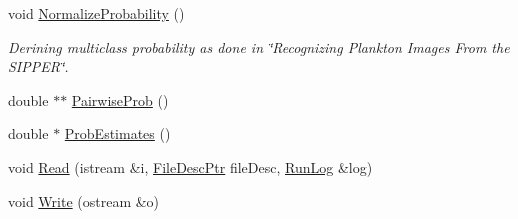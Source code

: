 \begin{DoxyCompactItemize}
\item 
void \hyperlink{struct_s_v_m289___b_f_s_1_1svm__model_a5d10aa2ae9d53ccf8f3526d36357c55d}{Normalize\+Probability} ()
\begin{DoxyCompactList}\small\item\em Derining multiclass probability as done in \char`\"{}\+Recognizing Plankton Images From the S\+I\+P\+P\+E\+R\char`\"{}. \end{DoxyCompactList}\item 
double $\ast$$\ast$ \hyperlink{struct_s_v_m289___b_f_s_1_1svm__model_ac7bf5ba166c90b01162d5d13c5a86c98}{Pairwise\+Prob} ()
\item 
double $\ast$ \hyperlink{struct_s_v_m289___b_f_s_1_1svm__model_aa2db3a3a2e00164b47176c0a984b789a}{Prob\+Estimates} ()
\item 
void \hyperlink{struct_s_v_m289___b_f_s_1_1svm__model_a7bae381afc04a2f1a3ddbeb02971ecda}{Read} (istream \&i, \hyperlink{namespace_k_k_m_l_l_aa0d0b6ab4ec18868a399b8455b05d914}{File\+Desc\+Ptr} file\+Desc, \hyperlink{class_k_k_b_1_1_run_log}{Run\+Log} \&log)
\item 
void \hyperlink{struct_s_v_m289___b_f_s_1_1svm__model_ae35f7d5d59e48db405bb287fd06c7a37}{Write} (ostream \&o)
\end{DoxyCompactItemize}
